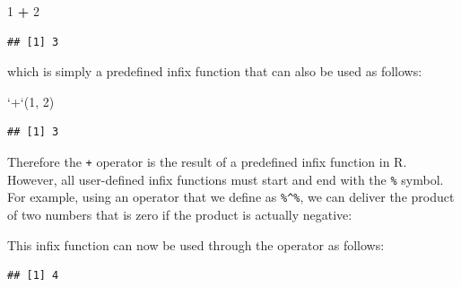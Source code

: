 \documentclass[12pt,]{krantz}
\newenvironment{Shaded}{\begin{snugshade}}{\end{snugshade}}
\newcommand{\DataTypeTok}[1]{\textcolor[rgb]{0.27,0.27,0.27}{#1}}
\newcommand{\DecValTok}[1]{\textcolor[rgb]{0.06,0.06,0.06}{#1}}
\newcommand{\StringTok}[1]{\textcolor[rgb]{0.5,0.5,0.5}{#1}}
\newcommand{\ControlFlowTok}[1]{\textcolor[rgb]{0.27,0.27,0.27}{\textbf{#1}}}
\newcommand{\OperatorTok}[1]{\textcolor[rgb]{0.43,0.43,0.43}{\textbf{#1}}}
\newcommand{\NormalTok}[1]{#1}
\begin{document}
\begin{Shaded}
\begin{Highlighting}[]
\DecValTok{1} \OperatorTok{+}\StringTok{ }\DecValTok{2}
\end{Highlighting}
\end{Shaded}

\begin{verbatim}
## [1] 3
\end{verbatim}

which is simply a predefined infix function that can also be used as
follows:

\begin{Shaded}
\begin{Highlighting}[]
\StringTok{`}\DataTypeTok{+}\StringTok{`}\NormalTok{(}\DecValTok{1}\NormalTok{, }\DecValTok{2}\NormalTok{)}
\end{Highlighting}
\end{Shaded}

\begin{verbatim}
## [1] 3
\end{verbatim}

Therefore the \texttt{+} operator is the result of a predefined infix
function in R. However, all user-defined infix functions must start and
end with the \texttt{\%} symbol. For example, using an operator that we
define as \texttt{\%\^{}\%}, we can deliver the product of two numbers
that is zero if the product is actually negative:

\begin{Shaded}
\end{Shaded}

This infix function can now be used through the operator as follows:

\begin{Shaded}
\end{Shaded}

\begin{verbatim}
## [1] 4
\end{verbatim}
\end{document}
